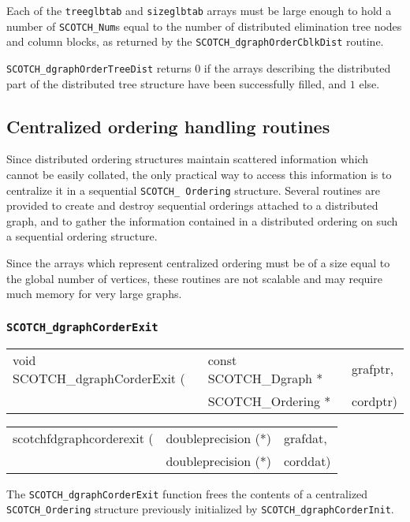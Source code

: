 \begin{itemize}
Each of the {\tt treeglbtab} and {\tt size\lbt glb\lbt tab} arrays
must be large enough to hold a number of {\tt SCOTCH\_\lbt Num}s equal
to the number of distributed elimination tree nodes and column blocks,
as returned by the {\tt SCOTCH\_\lbt dgraph\lbt Order\lbt Cblk\lbt Dist}
routine.

\progret

{\tt SCOTCH\_dgraphOrderTreeDist} returns $0$ if the arrays describing
the distributed part of the distributed tree structure have been
successfully filled, and $1$ else.
\end{itemize}

\subsection{Centralized ordering handling routines}
\label{sec-lib-corder}

Since distributed ordering structures maintain scattered information
which cannot be easily collated, the only practical way to access this
information is to centralize it in a sequential {\tt SCOTCH\_\lbt
Ordering} structure. Several routines are provided to
create and destroy sequential orderings attached to a distributed
graph, and to gather the information contained in a distributed
ordering on such a sequential ordering structure.

Since the arrays which represent centralized ordering must be of a
size equal to the global number of vertices, these routines are not
scalable and may require much memory for very large graphs.

\subsubsection{{\tt SCOTCH\_dgraphCorderExit}}

\begin{itemize}
\progsyn

{\tt\begin{tabular}{l@{}ll}
void SCOTCH\_dgraphCorderExit ( & const SCOTCH\_Dgraph * & grafptr, \\
                                & SCOTCH\_Ordering *     & cordptr)
\end{tabular}}

{\tt\begin{tabular}{l@{}ll}
scotchfdgraphcorderexit ( & doubleprecision (*) & grafdat, \\
                          & doubleprecision (*) & corddat)
\end{tabular}}

\progdes

The {\tt SCOTCH\_dgraphCorderExit} function frees the contents of a
centralized {\tt SCOTCH\_\lbt Ordering} structure previously
initialized by {\tt SCOTCH\_\lbt dgraph\lbt Corder\lbt Init}.
\end{itemize}


